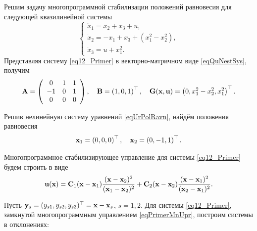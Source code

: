 \begin{example}
Решим задачу многопрограммной стабилизации положений равновесия
для следующей квазилинейной системы
\begin{equation}
\left\{%
\begin{array}{l}
    \dot x_1=x_2+x_3+u,\\
    \dot x_2=-x_1+x_3+(x^2_1-x^2_2),\\
    \dot x_3=u+ x_1^2.
\end{array}%
\right. \label{eq12_Primer}
\end{equation}
Представляя систему \eqref{eq12_Primer} в векторно-матричном виде
\eqref{eqQuNestSys}, получим
\begin{equation}
{\bf A}=\left(%
\begin{array}{ccc}
  0 & 1 & 1 \\
  -1 & 0 & 1 \\
  0 & 0 & 0 \\
\end{array}%
\right),\quad{\bf B}=\left(%
  1 ,
  0 ,
  1 
\right)^\top,\quad{\bf G}({\bf x},{\bf u})=\left(%
  0 ,
  x^2_1-x^2_2 ,
  x_1^2 
\right)^\top.\nonumber
\end{equation}

Решив нелинейную систему уравнений \eqref{eqUrPolRavn}, найдём
положения равновесия $${\bf x}_1=\left(%
  0 ,
  0 ,
  0 
\right)^\top,\quad {\bf x}_2=\left(%
  0 ,
  -1 ,
  1 
\right)^\top.$$

Многопрограммное стабилизирующее управление для системы
\eqref{eq12_Primer} будем строить в виде
\begin{equation}
{\bf u}({\bf x})={\bf C}_1({\bf x}-{\bf x}_1)\frac{({\bf x}-{\bf x}_2)^2}{({\bf x}_1-{\bf x}_2)^2}
+{\bf C}_2({\bf x}-{\bf x}_2) \frac{({\bf x}-{\bf x}_1)^2}{({\bf x}_2-{\bf x}_1)^2}.
\label{eqPrimerMnUpr}
\end{equation}

Пусть ${\bf y}_s=(y_{s1}, y_{s2}, y_{s3})^\top={\bf x}-{\bf x}_s$,
$s=1, 2$. Для системы \eqref{eq12_Primer}, замкнутой
многопрограммным управлением \eqref{eqPrimerMnUpr}, построим
системы в отклонениях:


\end{example}
